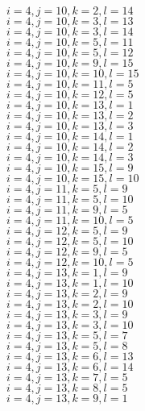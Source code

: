 \documentclass[14pt]{article}
\begin{document}
    $i=4,j=10,k=2,l=14 $ \\ 
    $i=4,j=10,k=3,l=13 $ \\ 
    $i=4,j=10,k=3,l=14 $ \\ 
    $i=4,j=10,k=5,l=11 $ \\ 
    $i=4,j=10,k=5,l=12 $ \\ 
    $i=4,j=10,k=9,l=15 $ \\ 
    $i=4,j=10,k=10,l=15 $ \\ 
    $i=4,j=10,k=11,l=5 $ \\ 
    $i=4,j=10,k=12,l=5 $ \\ 
    $i=4,j=10,k=13,l=1 $ \\ 
    $i=4,j=10,k=13,l=2 $ \\ 
    $i=4,j=10,k=13,l=3 $ \\ 
    $i=4,j=10,k=14,l=1 $ \\ 
    $i=4,j=10,k=14,l=2 $ \\ 
    $i=4,j=10,k=14,l=3 $ \\ 
    $i=4,j=10,k=15,l=9 $ \\ 
    $i=4,j=10,k=15,l=10 $ \\ 
    $i=4,j=11,k=5,l=9 $ \\ 
    $i=4,j=11,k=5,l=10 $ \\ 
    $i=4,j=11,k=9,l=5 $ \\ 
    $i=4,j=11,k=10,l=5 $ \\ 
    $i=4,j=12,k=5,l=9 $ \\ 
    $i=4,j=12,k=5,l=10 $ \\ 
    $i=4,j=12,k=9,l=5 $ \\ 
    $i=4,j=12,k=10,l=5 $ \\ 
    $i=4,j=13,k=1,l=9 $ \\ 
    $i=4,j=13,k=1,l=10 $ \\ 
    $i=4,j=13,k=2,l=9 $ \\ 
    $i=4,j=13,k=2,l=10 $ \\ 
    $i=4,j=13,k=3,l=9 $ \\ 
    $i=4,j=13,k=3,l=10 $ \\ 
    $i=4,j=13,k=5,l=7 $ \\ 
    $i=4,j=13,k=5,l=8 $ \\ 
    $i=4,j=13,k=6,l=13 $ \\ 
    $i=4,j=13,k=6,l=14 $ \\ 
    $i=4,j=13,k=7,l=5 $ \\ 
    $i=4,j=13,k=8,l=5 $ \\ 
    $i=4,j=13,k=9,l=1 $ \\ 
\end{document}
